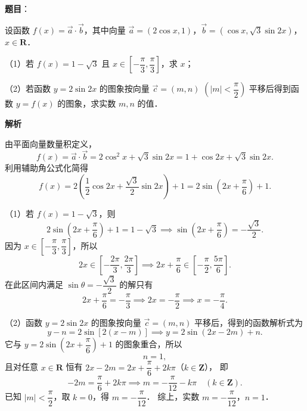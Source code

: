 \begin{answer}

\textbf{题目}：

设函数 $f(x) = \vec{a} \cdot \vec{b}$，其中向量 $\vec{a} = (2\cos x, 1)$，$\vec{b} = (\cos x, \sqrt{3}\sin 2x)$，$x \in \mathbf{R}$．

（1）若 $f(x) = 1 - \sqrt{3}$ 且 $x \in \left[-\dfrac{\pi}{3}, \dfrac{\pi}{3}\right]$，求 $x$；

（2）若函数 $y = 2\sin 2x$ 的图象按向量 $\vec{c} = (m, n)$ $\left(|m| < \dfrac{\pi}{2}\right)$ 平移后得到函数 $y = f(x)$ 的图象，求实数 $m, n$ 的值．

\textbf{解析}

由平面向量数量积定义，
\nopagebreak[4]
\[
f(x) = \vec{a} \cdot \vec{b} = 2\cos^2 x + \sqrt{3}\sin 2x = 1 + \cos 2x + \sqrt{3}\sin 2x.
\]
利用辅助角公式化简得
\nopagebreak[4]
\[
f(x) = 2\left(\frac{1}{2}\cos 2x + \frac{\sqrt{3}}{2}\sin 2x\right) + 1 = 2\sin\left(2x + \frac{\pi}{6}\right) + 1.
\]

（1）若 $f(x) = 1 - \sqrt{3}$，则
\nopagebreak[4]
\[
2\sin\left(2x + \frac{\pi}{6}\right) + 1 = 1 - \sqrt{3} \implies \sin\left(2x + \frac{\pi}{6}\right) = -\frac{\sqrt{3}}{2}.
\]
因为 $x \in \left[-\dfrac{\pi}{3}, \dfrac{\pi}{3}\right]$，所以
\nopagebreak[4]
\[
2x \in \left[-\frac{2\pi}{3}, \frac{2\pi}{3}\right] \implies 2x + \frac{\pi}{6} \in \left[-\frac{\pi}{2}, \frac{5\pi}{6}\right].
\]
在此区间内满足 $\sin\theta = -\dfrac{\sqrt{3}}{2}$ 的解只有
\nopagebreak[4]
\[
2x + \frac{\pi}{6} = -\frac{\pi}{3} \implies 2x = -\frac{\pi}{2} \implies x = -\frac{\pi}{4}.
\]

（2）函数 $y = 2\sin 2x$ 的图象按向量 $\vec{c} = (m, n)$ 平移后，得到的函数解析式为
\nopagebreak[4]
\[
y - n = 2\sin[2(x - m)] \implies y = 2\sin(2x - 2m) + n.
\]
它与 $y = 2\sin\left(2x + \dfrac{\pi}{6}\right) + 1$ 的图象重合，所以
\nopagebreak[4]
\[
n = 1,
\]
且对任意 $x \in \mathbf{R}$ 恒有 $2x - 2m = 2x + \dfrac{\pi}{6} + 2k\pi$（$k \in \mathbf{Z}$），
即
\nopagebreak[4]
\[
-2m = \frac{\pi}{6} + 2k\pi \implies m = -\frac{\pi}{12} - k\pi \quad (k \in \mathbf{Z}).
\]
已知 $|m| < \dfrac{\pi}{2}$，取 $k = 0$，得 $m = -\dfrac{\pi}{12}$．
综上，实数 $m = -\dfrac{\pi}{12}$，$n = 1$．


\end{answer}
